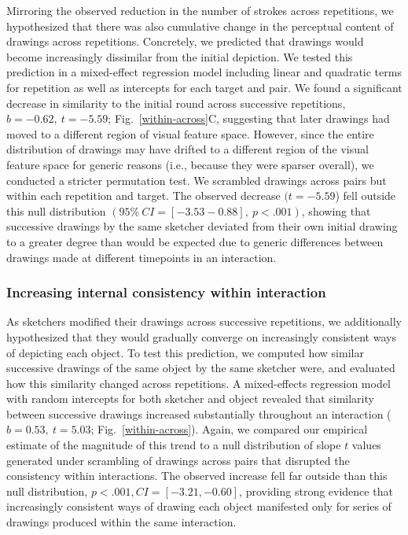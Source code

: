 \documentclass[10pt,letterpaper]{article}
\begin{document}
Mirroring the observed reduction in the number of strokes across repetitions, we hypothesized that there was also cumulative change in the perceptual content of drawings across repetitions. 
Concretely, we predicted that drawings would become increasingly dissimilar from the initial depiction. 
We tested this prediction in a mixed-effect regression model including linear and quadratic terms for repetition as well as intercepts for each target and pair.
We found a significant decrease in similarity to the initial round across successive repetitions, $b = -0.62,~t = -5.59$; Fig.~\ref{within-across}C, suggesting that later drawings had moved to a different region of visual feature space. 
However, since the entire distribution of drawings may have drifted to a different region of the visual feature space for generic reasons (i.e., because they were sparser overall), we conducted a stricter permutation test.  
We scrambled drawings across pairs but within each repetition and target.
The observed decrease $(t = -5.59$) fell outside this null distribution $(95\%~CI= [-3.53 -0.88], ~p < .001)$, showing that successive drawings by the same sketcher deviated from their own initial drawing to a greater degree than would be expected due to generic differences between drawings made at different timepoints in an interaction. 

\subsubsection{Increasing internal consistency within interaction}



As sketchers modified their drawings across successive repetitions, we additionally hypothesized that they would gradually converge on increasingly consistent ways of depicting each object. 
To test this prediction, we computed how similar successive drawings of the same object by the same sketcher were, and evaluated how this similarity changed across repetitions. 
A mixed-effects regression model with random intercepts for both sketcher and object revealed that similarity between successive drawings increased substantially throughout an interaction ($b = 0.53,~t = 5.03$; Fig.~\ref{within-across}). 
Again, we compared our empirical estimate of the magnitude of this trend to a null distribution of slope $t$ values generated under scrambling of drawings across pairs that disrupted the consistency within interactions.
The observed increase fell far outside than this null distribution, $p < .001, CI = [-3.21, -0.60]$, providing strong evidence that increasingly consistent ways of drawing each object manifested only for series of drawings produced within the same interaction. 
\end{document}
